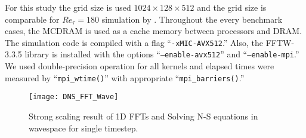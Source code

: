 For this study the grid size is used $1024\times128\times512$ and the grid size is comparable for $Re_\tau = 180$ simulation by \cite{Kim:1987ub}. Throughout the every benchmark cases, the MCDRAM is used as a cache memory between processors and DRAM. The simulation code is compiled with a flag ``{\tt -xMIC-AVX512}.'' Also, the FFTW-3.3.5 library is installed with the options ``{\tt --enable-avx512}'' and ``{\tt --enable-mpi}.'' \cite{Frigo:2005tu} We used double-precision operation for all kernels and elapsed times were measured by ``{\tt mpi\_wtime()}'' with appropriate ``{\tt mpi\_barriers()}.''

\begin{figure}[htb]
 \begin{center}
   \texttt{[image: DNS\_FFT\_Wave]}
   \caption{Strong scaling result of 1D FFTs and Solving N-S equations in wavespace for single timestep.}
   \label{fig:DNS_strong_scale_fft_wave}
 \end{center}
\end{figure}

